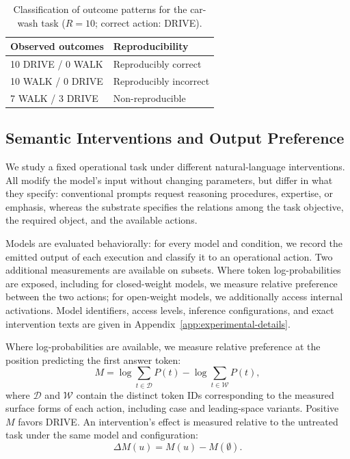\begin{table}[t]
\centering
\caption{Classification of outcome patterns for the car-wash task
($R=10$; correct action: DRIVE).}
\label{tab:operational-states}
\vspace{6pt}

\small
\begin{tabular*}{0.75\columnwidth}{@{\extracolsep{\fill}}ll@{}}
\toprule
\textbf{Observed outcomes} & \textbf{Reproducibility} \\
\midrule
10 DRIVE / 0 WALK & Reproducibly correct \\
10 WALK / 0 DRIVE & Reproducibly incorrect \\
7 WALK / 3 DRIVE & Non-reproducible \\
\bottomrule
\end{tabular*}
\end{table}

\subsection{Semantic Interventions and Output Preference}
\label{sec:semantic-interventions}

We study a fixed operational task under different natural-language
interventions. All modify the model's input without changing parameters,
but differ in what they specify: conventional prompts request reasoning
procedures, expertise, or emphasis, whereas the substrate specifies the
relations among the task objective, the required object, and the available
actions.

Models are evaluated behaviorally: for every model and condition, we record
the emitted output of each execution and classify it to an operational
action. Two additional measurements are available on subsets. Where token
log-probabilities are exposed, including for closed-weight models, we
measure relative preference between the two actions; for open-weight
models, we additionally access internal activations. Model identifiers,
access levels, inference configurations, and exact intervention texts
are given in Appendix~\ref{app:experimental-details}.

Where log-probabilities are available, we measure relative preference
at the position predicting the first answer token:
\begin{equation}
    M = \log \sum_{t \in \mathcal{D}} P(t)
      - \log \sum_{t \in \mathcal{W}} P(t),
    \label{eq:decision-margin}
\end{equation}
where $\mathcal{D}$ and $\mathcal{W}$ contain the distinct token IDs
corresponding to the measured surface forms of each action, including
case and leading-space variants. Positive $M$ favors DRIVE. An
intervention's effect is measured relative to the untreated task under
the same model and configuration:
\begin{equation}
    \Delta M(u) = M(u) - M(\emptyset).
    \label{eq:intervention-effect}
\end{equation}

